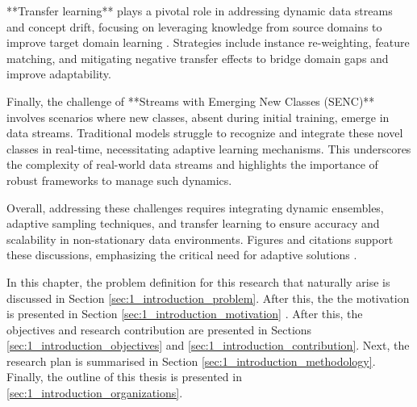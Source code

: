**Transfer learning** plays a pivotal role in addressing dynamic data streams and concept drift, focusing on leveraging knowledge from source domains to improve target domain learning \cite{pan2009survey, wang2018systematic}. Strategies include instance re-weighting, feature matching, and mitigating negative transfer effects to bridge domain gaps and improve adaptability.  

Finally, the challenge of **Streams with Emerging New Classes (SENC)** involves scenarios where new classes, absent during initial training, emerge in data streams. Traditional models struggle to recognize and integrate these novel classes in real-time, necessitating adaptive learning mechanisms. This underscores the complexity of real-world data streams and highlights the importance of robust frameworks to manage such dynamics.  

Overall, addressing these challenges requires integrating dynamic ensembles, adaptive sampling techniques, and transfer learning to ensure accuracy and scalability in non-stationary data environments. Figures and citations support these discussions, emphasizing the critical need for adaptive solutions \cite{chawla2003smoteboost, wang2010negative}.
     
In this chapter, the problem definition for this research 
that naturally arise is discussed in  Section \ref{sec:1_introduction_problem}. After this, the the motivation is presented in Section \ref{sec:1_introduction_motivation} . After this, the objectives and
research contribution are presented in Sections \ref{sec:1_introduction_objectives} and \ref{sec:1_introduction_contribution}. Next, the research plan is summarised in Section \ref{sec:1_introduction_methodology}.  Finally, the outline of this thesis is presented in
\ref{sec:1_introduction_organizations}.